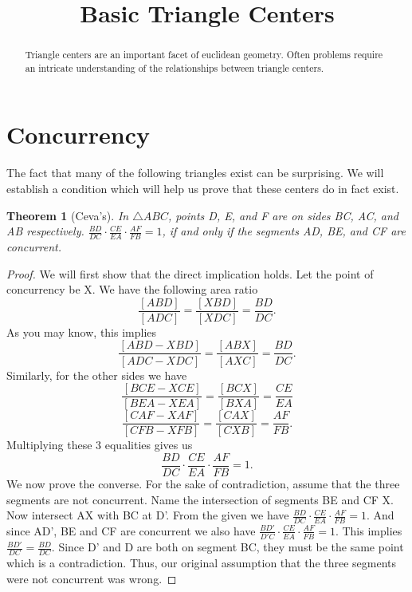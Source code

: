 \documentclass[letterpaper]{article}
\theoremstyle{plain}
\newtheorem{thm}{Theorem}[section]
\theoremstyle{definition}
\theoremstyle{remark}
\begin{document}
\title{Basic Triangle Centers}
\maketitle

\begin{abstract}
    Triangle centers are an important facet of euclidean geometry.
    Often problems require an intricate understanding of the relationships between triangle centers.
\end{abstract}
\section{Concurrency}
    The fact that many of the following triangles exist can be surprising. We will establish a condition which will help us prove that these centers do in fact exist.
    \begin{mdframed}
        \begin{thm}[Ceva's] 
            In $\triangle ABC$, points D, E, and F are on sides BC, AC, and AB respectively. $\frac{BD}{DC}\cdot \frac{CE}{EA}\cdot\frac{AF}{FB} = 1$, if and only if the segments AD, BE, and CF are concurrent.
            
        \end{thm}
        
    \end{mdframed} 
    \begin{proof}
        We will first show that the direct implication holds. Let the point of concurrency be X. We have the following area ratio 
        $$\frac{[ABD]}{[ADC]} = \frac{[XBD]}{[XDC]}=\frac{BD}{DC}.$$
        As you may know, this implies $$\frac{[ABD-XBD]}{[ADC-XDC]}=\frac{[ABX]}{[AXC]}=\frac{BD}{DC}.$$
        Similarly, for the other sides we have 
        $$\frac{[BCE-XCE]}{[BEA-XEA]}=\frac{[BCX]}{[BXA]}=\frac{CE}{EA}$$
        $$\frac{[CAF-XAF]}{[CFB-XFB]}=\frac{[CAX]}{[CXB]}=\frac{AF}{FB}.$$
        Multiplying these 3 equalities gives us 
        $$\frac{BD}{DC}\cdot \frac{CE}{EA}\cdot\frac{AF}{FB} = 1.$$
        We now prove the converse. For the sake of contradiction, assume that the three segments are not concurrent.
        Name the intersection of segments BE and CF X. Now intersect AX with BC at D'. From the given we have $\frac{BD}{DC}\cdot \frac{CE}{EA}\cdot\frac{AF}{FB} = 1.$
        And since AD', BE and CF are concurrent we also have $\frac{BD'}{D'C}\cdot \frac{CE}{EA}\cdot\frac{AF}{FB} = 1.$
        This implies $\frac{BD'}{DC}=\frac{BD}{DC}$. Since D' and D are both on segment BC, they must be the same point which is a contradiction. Thus, our original assumption 
        that the three segments were not concurrent was wrong.
    \end{proof} 
 
\end{document}
